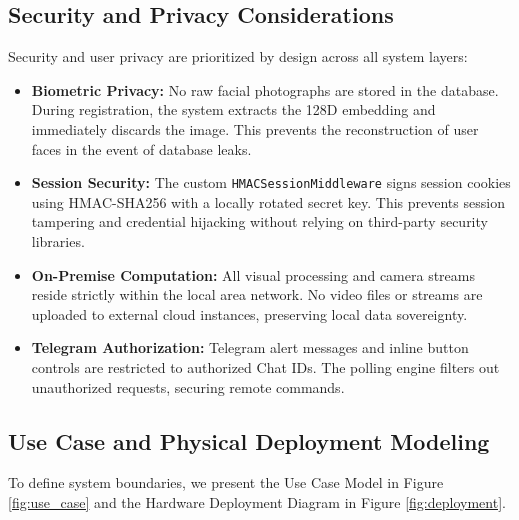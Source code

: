 \documentclass[12pt,a4paper]{article}
\begin{document}
\subsection{Security and Privacy Considerations}
Security and user privacy are prioritized by design across all system layers:
\begin{itemize}
    \item \textbf{Biometric Privacy:} No raw facial photographs are stored in the database. During registration, the system extracts the 128D embedding and immediately discards the image. This prevents the reconstruction of user faces in the event of database leaks.
    \item \textbf{Session Security:} The custom \texttt{HMACSessionMiddleware} signs session cookies using HMAC-SHA256 with a locally rotated secret key. This prevents session tampering and credential hijacking without relying on third-party security libraries.
    \item \textbf{On-Premise Computation:} All visual processing and camera streams reside strictly within the local area network. No video files or streams are uploaded to external cloud instances, preserving local data sovereignty.
    \item \textbf{Telegram Authorization:} Telegram alert messages and inline button controls are restricted to authorized Chat IDs. The polling engine filters out unauthorized requests, securing remote commands.
\end{itemize}

\subsection{Use Case and Physical Deployment Modeling}
To define system boundaries, we present the Use Case Model in Figure \ref{fig:use_case} and the Hardware Deployment Diagram in Figure \ref{fig:deployment}.
\end{document}
